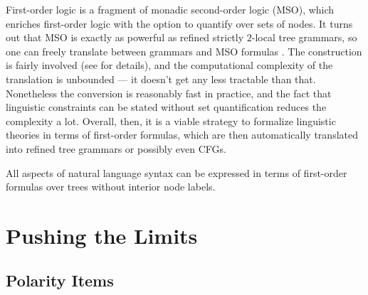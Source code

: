 First-order logic is a fragment of monadic second-order logic (MSO), which enriches first-order logic with the option to quantify over sets of nodes.
It turns out that MSO is exactly as powerful as refined strictly $2$-local tree grammars, so one can freely translate between grammars and MSO formulas \citep{Buechi60}.
The construction is fairly involved (see \citealt{Morawietz03} for details), and the computational complexity of the translation is unbounded --- it doesn't get any less tractable than that.
Nonetheless the conversion is reasonably fast in practice, and the fact that linguistic constraints can be stated without set quantification reduces the complexity a lot.
Overall, then, it is a viable strategy to formalize linguistic theories in terms of first-order formulas, which are then automatically translated into refined tree grammars or possibly even CFGs.
%
\begin{conjecture}[FO-Syntax]
    All aspects of natural language syntax can be expressed in terms of first-order formulas over trees without interior node labels.
\end{conjecture}

\section{Pushing the Limits}

\subsection{Polarity Items}


